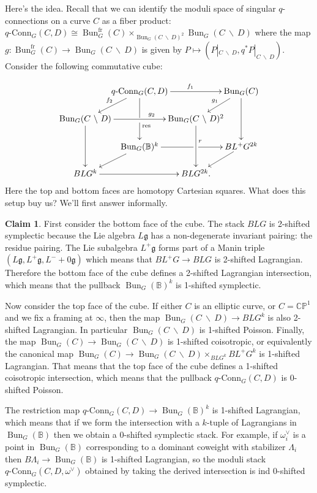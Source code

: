\documentclass[11pt, oneside, reqno]{amsart}
\theoremstyle{definition} \newtheorem{definition}{Definition}[section]
\newtheorem*{claim}{Claim}
\theoremstyle{definition} \newtheorem{remark}[definition]{Remark}
\theoremstyle{definition} \newtheorem{remarks}[definition]{Remarks}
\theoremstyle{definition} \newtheorem{question}[definition]{Question}
\theoremstyle{definition} \newtheorem*{note}{Note}
\theoremstyle{definition} \newtheorem{example}[definition]{Example}
\theoremstyle{definition} \newtheorem{examples}[definition]{Examples}
\renewcommand{\gg}{\mathfrak{g}}
\newcommand{\bb}[1]{\mathbb{#1}}
\newcommand{\mr}[1]{\mathrm{#1}}
\newcommand{\bs}{\ \backslash \ }
\newcommand{\iso}{\cong}
\DeclareMathOperator{\bun}{Bun}
\newcommand{\qconn}{q\text{-Conn}}
\newcommand{\fr}{\mathrm{fr}}
\begin{document}
Here's the idea.  Recall that we can identify the moduli space of singular $q$-connections on a curve $C$ as a fiber product: $\qconn_G(C, D) \iso \bun_G^\fr(C) \times_{\bun_G(C \! \bs \! D)^2} \bun_G(C \! \bs \! D)$ where the map $g \colon \bun_G^\fr(C) \to \bun_G(C \! \bs \! D)$ is given by $P \mapsto (P|_{C \! \bs \! D}, q^*P|_{C \! \bs \! D})$.  Consider the following commutative cube:

\[\xymatrix@C-30pt@R-8pt{
& \qconn_G(C, D) \ar[rr]^{f_1} \ar'[d][dd]^(.25){\mr{res}} & & \bun_G(C) \ar[dd]
\\
\bun_G(C \bs D) \ar@{<-}[ur]^{f_2} \ar[rr]^(.6){g_2} \ar[dd] & & \bun_G(C \bs D)^2 \ar@{<-}[ur]^{g_1} \ar[dd]^(.4)r
\\
& \bun_G(\bb B)^k \ar'[r][rr] & & BL^+G^{2k}
\\
BLG^k \ar[rr]\ar@{<-}[ur] & & BLG^{2k}. \ar@{<-}[ur]
}\]
Here the top and bottom faces are homotopy Cartesian squares.  What does this setup buy us?  We'll first answer informally.

\begin{claim}
First consider the bottom face of the cube.  The stack $BLG$ is 2-shifted symplectic because the Lie algebra $L\gg$ has a non-degenerate invariant pairing: the residue pairing.  The Lie subalgebra $L^+\gg$ forms part of a Manin triple $(L\gg, L^+\gg, L^-+0\gg)$ which means that $BL^+G \to BLG$ is 2-shifted Lagrangian.  Therefore the bottom face of the cube defines a 2-shifted Lagrangian intersection, which means that the pullback $\bun_G(\bb B)^k$ is 1-shifted symplectic.

Now consider the top face of the cube.  If either $C$ is an elliptic curve, or $C=\bb{CP}^1$ and we fix a framing at $\infty$, then the map $\bun_G(C \bs D) \to BLG^k$ is also 2-shifted Lagrangian.  In particular $\bun_G(C \bs D)$ is 1-shifted Poisson.  Finally, the map $\bun_G(C) \to \bun_G(C \bs D)$ is 1-shifted coisotropic, or equivalently the canonical map $\bun_G(C) \to \bun_G(C \bs D) \times_{BLG^k} BL^+G^k$ is 1-shifted Lagrangian.  That means that the top face of the cube defines a 1-shifted coisotropic intersection, which means that the pullback $\qconn_G(C,D)$ is 0-shifted Poisson.

The restriction map $\qconn_G(C,D) \to \bun_G(\bb B)^k$ is 1-shifted Lagrangian, which means that if we form the intersection with a $k$-tuple of Lagrangians in $\bun_G(\bb B)$ then we obtain a 0-shifted symplectic stack.  For example, if $\omega_i^\vee$ is a point in $\bun_G(\bb B)$ corresponding to a dominant coweight with stabilizer $\Lambda_i$ then $B \Lambda_i \to \bun_G(\bb B)$ is 1-shifted Lagrangian, so the moduli stack $\qconn_G(C,D, \omega^\vee)$ obtained by taking the derived intersection is ind 0-shifted symplectic.
\end{claim}
\end{document}
